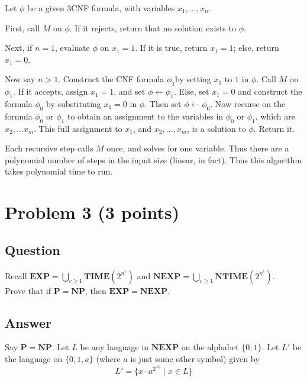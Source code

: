 \documentclass{article}
\renewcommand{\P}{\mathbf{P}}
\newcommand{\NP}{\mathbf{NP}}
\newcommand{\EXP}{\mathbf{EXP}}
\newcommand{\NEXP}{\mathbf{NEXP}}
\newcommand{\TIME}{\mathbf{TIME}}
\newcommand{\NTIME}{\mathbf{NTIME}}
\begin{document}
	Let $\phi$ be a given 3CNF formula, with variables $x_1, \dots, x_n$.

	First, call $M$ on $\phi$.  If it rejects, return that no solution exists to $\phi$.

	Next, if $n = 1$, evaluate $\phi$ on $x_1 = 1$.  If it is true, return $x_1 = 1$; else, return $x_1 = 0$.

	Now say $n > 1$.  Construct the CNF formula $\phi_1$by setting $x_1$ to $1$ in $\phi$.  Call $M$ on $\phi_1$.  If it accepts, assign $x_1 = 1$, and set $\phi \gets \phi_1$.  Else, set $x_1 = 0$ and construct the formula $\phi_0$ by substituting $x_1 = 0$ in $\phi$.  Then set $\phi \gets \phi_0$.  Now recurse on the formula $\phi_0$ or $\phi_1$ to obtain an assignment to the variables in $\phi_0$ or $\phi_1$, which are $x_2, \dots x_m$.  This full assignment to $x_1$, and $x_2, \dots, x_m$, is a solution to $\phi$.  Return it.

	Each recursive step calls $M$ once, and solves for one variable.  Thus there are a polynomial number of steps in the input size (linear, in fact).  Thus this algorithm takes polynomial time to run.


    \section*{Problem 3 (3 points)}
	\subsection*{Question}
    Recall $\EXP = \bigcup_{c\ge 1} \TIME(2^{n^c})$ and $\NEXP = \bigcup_{c\ge 1} \NTIME(2^{n^c})$. \\
    Prove that if $\P = \NP$, then $\EXP = \NEXP$.

	\subsection*{Answer}
	Say $\P = \NP$.  Let $L$ be any language in $\NEXP$ on the alphabet $\{0, 1\}$.  Let $L'$ be the language on $\{0, 1, a\}$ (where $a$ is just some other symbol) given by
	$$L' = \{x \cdot a^{2^{|x|}} \mid x \in L\}$$
\end{document}
